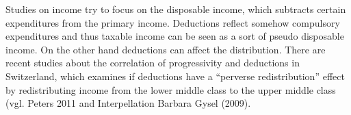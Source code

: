 \documentclass[twoside]{article}\usepackage[]{graphicx}\usepackage[]{color}
\begin{document}
\begin{multicols}{2}
Studies on income try to focus on the disposable income, which subtracts certain expenditures from the primary income. Deductions reflect somehow compulsory expenditures and thus taxable income can be seen as a sort of pseudo disposable income. On the other hand deductions can affect the distribution. There are recent studies about the correlation of progressivity and deductions in Switzerland, which examines if deductions have a ``perverse redistribution'' effect by redistributing income from the lower middle class to the upper middle class (vgl. Peters 2011 and Interpellation Barbara Gysel (2009).








\end{multicols}
\end{document}
